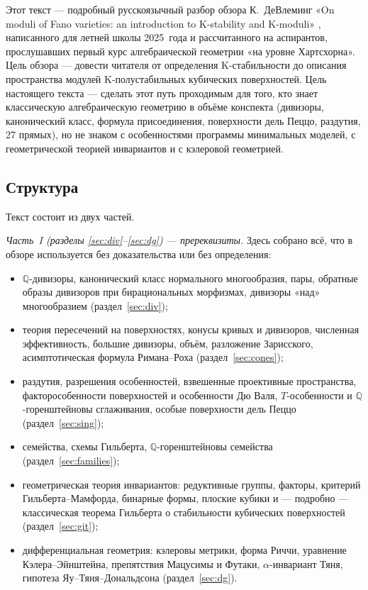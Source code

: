 \documentclass[11pt,a4paper]{article}
\theoremstyle{plain}
\theoremstyle{definition}
\theoremstyle{remark}
\newcommand{\Q}{\mathbb{Q}}
\begin{document}
Этот текст --- подробный русскоязычный разбор обзора К.~ДеВлеминг «On moduli of Fano varieties:
an introduction to K-stability and K-moduli» \cite{DeV}, написанного для летней школы 2025~года и
рассчитанного на аспирантов, прослушавших первый курс алгебраической геометрии «на уровне
Хартсхорна». Цель обзора --- довести читателя от определения K-стабильности до описания
пространства модулей K-полустабильных кубических поверхностей. Цель настоящего текста ---
сделать этот путь проходимым для того, кто знает классическую алгебраическую геометрию в объёме
конспекта \cite{AG} (дивизоры, канонический класс, формула присоединения, поверхности дель Пеццо,
раздутия, 27 прямых), но не знаком с особенностями программы минимальных моделей, с геометрической
теорией инвариантов и с кэлеровой геометрией.

\subsection*{Структура}

Текст состоит из двух частей.

\emph{Часть~I (разделы \ref{sec:div}--\ref{sec:dg}) --- пререквизиты.} Здесь собрано всё, что
в обзоре используется без доказательства или без определения:
\begin{itemize}
\item $\Q$-дивизоры, канонический класс нормального многообразия, пары, обратные образы дивизоров
при бирациональных морфизмах, дивизоры «над» многообразием (раздел~\ref{sec:div});
\item теория пересечений на поверхностях, конусы кривых и дивизоров, численная эффективность,
большие дивизоры, объём, разложение Зарисского, асимптотическая формула Римана--Роха
(раздел~\ref{sec:cones});
\item раздутия, разрешения особенностей, взвешенные проективные пространства, факторособенности
поверхностей и особенности Дю Валя, $T$-особенности и $\Q$-горенштейновы сглаживания, особые
поверхности дель Пеццо (раздел~\ref{sec:sing});
\item семейства, схемы Гильберта, $\Q$-горенштейновы семейства (раздел~\ref{sec:families});
\item геометрическая теория инвариантов: редуктивные группы, факторы, критерий Гильберта--Мамфорда,
бинарные формы, плоские кубики и --- подробно --- классическая теорема Гильберта о стабильности
кубических поверхностей (раздел~\ref{sec:git});
\item дифференциальная геометрия: кэлеровы метрики, форма Риччи, уравнение Кэлера--Эйнштейна,
препятствия Мацусимы и Футаки, $\alpha$-инвариант Тяня, гипотеза Яу--Тяня--Дональдсона
(раздел~\ref{sec:dg}).
\end{itemize}
\end{document}
